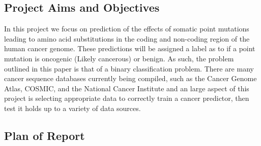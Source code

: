 \subsection{Project Aims and Objectives}
In this project we focus on prediction of the effects of somatic point mutations leading to amino acid substitutions\cite{Shihab2013} in the coding and non-coding region of the human cancer genome. These predictions will be assigned a label as to if a point mutation is oncogenic (Likely cancerous) or benign. As such, the problem outlined in this paper is that of a binary classification problem.
There are many cancer sequence databases currently being compiled, such as the Cancer Genome Atlas, COSMIC, and the National Cancer Institute and an large aspect of this project is selecting appropriate data to correctly train a cancer predictor, then test it holds up to a variety of data sources.


\subsection{Plan of Report}